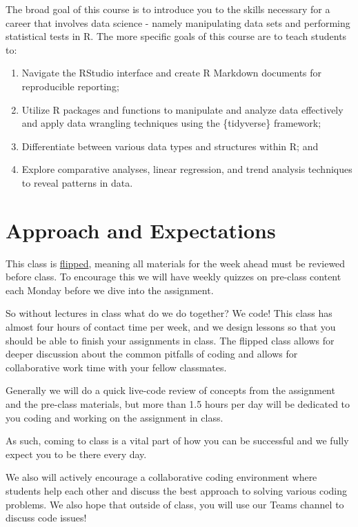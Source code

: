 \documentclass[
]{book}
\providecommand{\tightlist}{%
  \setlength{\itemsep}{0pt}\setlength{\parskip}{0pt}}
\begin{document}
The broad goal of this course is to introduce you to the skills necessary for a career that involves data science - namely manipulating data sets and performing statistical tests in R. The more specific goals of this course are to teach students to:

\begin{enumerate}
\def\labelenumi{\arabic{enumi}.}
\tightlist
\item
  Navigate the RStudio interface and create R Markdown documents for reproducible reporting;
\item
  Utilize R packages and functions to manipulate and analyze data effectively and apply data wrangling techniques using the \{tidyverse\} framework;
\item
  Differentiate between various data types and structures within R; and
\item
  Explore comparative analyses, linear regression, and trend analysis techniques to reveal patterns in data.
\end{enumerate}

\hypertarget{approach-and-expectations}{%
\section*{Approach and Expectations}\label{approach-and-expectations}}

This class is \href{https://ieeexplore.ieee.org/document/7344151}{flipped}, meaning all materials for the week ahead must be reviewed before class. To encourage this we will have weekly quizzes on pre-class content each Monday before we dive into the assignment.

So without lectures in class what do we do together? We code! This class has almost four hours of contact time per week, and we design lessons so that you should be able to finish your assignments in class. The flipped class allows for deeper discussion about the common pitfalls of coding and allows for collaborative work time with your fellow classmates.

Generally we will do a quick live-code review of concepts from the assignment and the pre-class materials, but more than 1.5 hours per day will be dedicated to you coding and working on the assignment in class.

As such, coming to class is a vital part of how you can be successful and we fully expect you to be there every day.

We also will actively encourage a collaborative coding environment where students help each other and discuss the best approach to solving various coding problems. We also hope that outside of class, you will use our Teams channel to discuss code issues!
\end{document}
